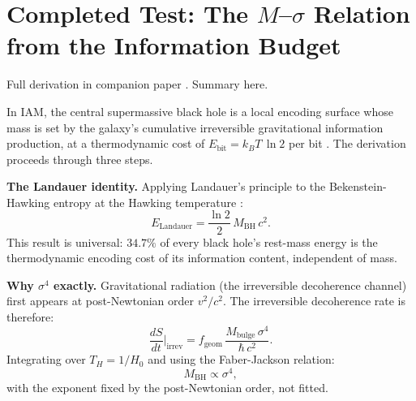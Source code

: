 \documentclass[12pt,a4paper]{article}
\begin{document}
\section{Completed Test: The $M$--$\sigma$ Relation from the Information Budget}
\label{sec:msigma}

Full derivation in companion paper \citep{Mahaffey2026c}. Summary here.

In IAM, the central supermassive black hole is a local encoding surface whose mass is
set by the galaxy's cumulative irreversible gravitational information production, at a
thermodynamic cost of $E_\mathrm{bit} = k_B T\,\ln 2$ per bit \citep{Landauer1961}.
The derivation proceeds through three steps.

\textbf{The Landauer identity.} Applying Landauer's principle to the
Bekenstein-Hawking entropy \citep{Bekenstein1973} at the Hawking temperature
\citep{Hawking1975}:
\begin{equation}
  E_\mathrm{Landauer} = \frac{\ln 2}{2}\,M_\mathrm{BH}\,c^2.
  \label{eq:landauer}
\end{equation}
This result is universal: $34.7\%$ of every black hole's rest-mass energy is the
thermodynamic encoding cost of its information content, independent of mass.

\textbf{Why $\sigma^4$ exactly.} Gravitational radiation (the irreversible decoherence
channel) first appears at post-Newtonian order $v^2/c^2$. The irreversible decoherence
rate is therefore:
\begin{equation}
  \frac{dS}{dt}\bigg|_\mathrm{irrev}
    = f_\mathrm{geom}\,\frac{M_\mathrm{bulge}\,\sigma^4}{\hbar\,c^2}.
\end{equation}
Integrating over $T_H = 1/H_0$ and using the Faber-Jackson relation:
\begin{equation}
  M_\mathrm{BH} \propto \sigma^4,
\end{equation}
with the exponent fixed by the post-Newtonian order, not fitted.

\begin{table}[h]
\centering
\small
\caption{$M$--$\sigma$ comparison.}
\label{tab:msigma}
\end{table}
\end{document}
